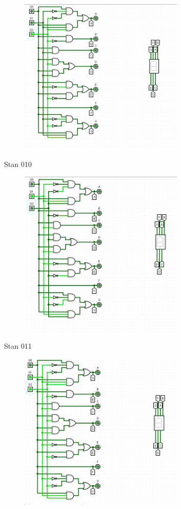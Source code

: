\documentclass[]{article}
\begin{document}
\begin{figure}[H]
	\centering
	\includegraphics[width=0.7\textwidth]{JEDEN_001.png}
\end{figure}
\newpage
Stan 010
\begin{figure}[H]
	\centering
	\includegraphics[width=0.7\textwidth]{JEDEN_010.png}
\end{figure}
\newpage
Stan 011
\begin{figure}[H]
	\centering
	\includegraphics[width=0.7\textwidth]{JEDEN_011.png}
\end{figure}
\end{document}

